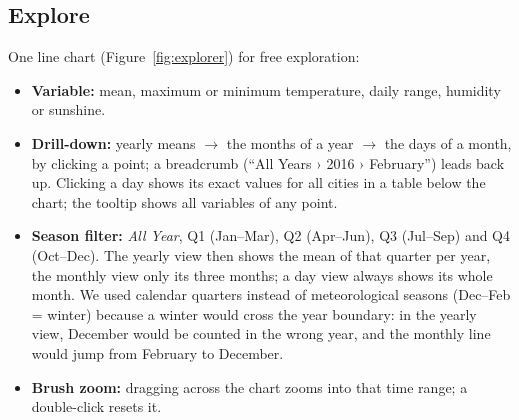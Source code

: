 \documentclass[11pt,a4paper]{article}
\begin{document}
\subsection*{Explore}
One line chart (Figure~\ref{fig:explorer}) for free exploration:
\begin{itemize}
    \item \textbf{Variable:} mean, maximum or minimum temperature, daily range, humidity or sunshine.
    \item \textbf{Drill-down:} yearly means $\rightarrow$ the months of a year $\rightarrow$ the days of a month, by clicking a point;
    a breadcrumb (``All Years › 2016 › February'') leads back up. Clicking a day shows its exact values for all cities in a table
    below the chart; the tooltip shows all variables of any point.
    \item \textbf{Season filter:} \emph{All Year}, Q1 (Jan--Mar), Q2 (Apr--Jun), Q3 (Jul--Sep) and Q4 (Oct--Dec). The yearly view then
    shows the mean of that quarter per year, the monthly view only its three months; a day view always shows its whole month.
    We used calendar quarters instead of meteorological seasons (Dec--Feb = winter) because a winter would cross the year boundary:
    in the yearly view, December would be counted in the wrong year, and the monthly line would jump from February to December.
    \item \textbf{Brush zoom:} dragging across the chart zooms into that time range; a double-click resets it.
\end{itemize}
\end{document}
